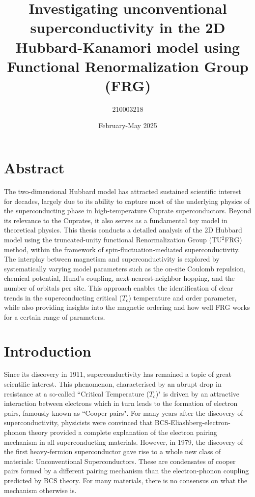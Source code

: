 \documentclass[12pt]{article}
\title{Investigating unconventional superconductivity in the 2D Hubbard-Kanamori model using Functional Renormalization Group (FRG)}
\author{210003218}
\date{February-May 2025}
\begin{document}
\maketitle
\tableofcontents 

\newpage 

\section{Abstract}



The two-dimensional Hubbard model has attracted sustained scientific interest for decades, largely due to its ability to capture most of the underlying physics of the superconducting phase in high-temperature Cuprate superconductors\cite{dagotto1994correlated}. 
Beyond its relevance to the Cuprates, it also serves as a fundamental toy model in theoretical physics. 
This thesis conducts a detailed analysis of the 2D Hubbard model using the truncated-unity functional Renormalization Group (TU$^2$FRG) method,
within the framework of spin-fluctuation-mediated superconductivity.  The interplay between magnetism and superconductivity is explored 
by systematically varying model parameters such as the on-site Coulomb repulsion, chemical potential, Hund's coupling, next-nearest-neighbor hopping, and the number of orbitals per
site. This approach enables the identification of clear trends in the superconducting critical ($T_c$) temperature and order parameter, while also
providing insights into the magnetic ordering and how well FRG works for a certain range of parameters.





\section{Introduction}

Since its discovery in 1911\cite{onnes1911superconductivity}, superconductivity has remained a topic of great scientific interest.
This phenomenon, characterised by an abrupt drop in resistance at a so-called ``Critical Temperature ($T_c$)"\cite{geballe2015tc} is driven by an attractive interaction
between electrons which in turn leads to the formation of electron pairs, famously known as ``Cooper pairs"\cite{schrieffer2018theory}. For many 
years after the discovery of superconductivity, physicists
were convinced that BCS-Eliashberg-electron-phonon theory \cite{schrieffer2018theory} provided a complete explanation of the electron pairing mechanism in all superconducting materials. 
However, in 1979, the discovery of the first heavy-fermion superconductor\cite{steglich1979superconductivity} gave rise to a whole new class of materials: Unconventional Superconductors. 
These are condensates of cooper pairs formed by a different pairing mechanism than the electron-phonon coupling predicted by BCS theory\cite{hirsch2015superconducting}.
For many materials, there is no consensus on what the mechanism otherwise is\cite{norman2011challenge}.\par
\end{document}
